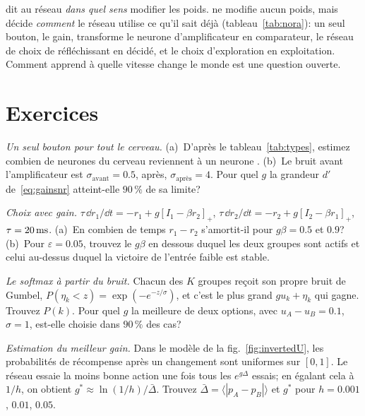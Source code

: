  dit au réseau \emph{dans quel sens} modifier les poids.  ne modifie aucun poids, mais décide \emph{comment} le réseau utilise ce qu'il sait déjà (tableau~\ref{tab:nora}): un seul bouton, le gain, transforme le neurone d'amplificateur en comparateur, le réseau de choix de \og réfléchissant\fg{} en \og décidé\fg{}, et le choix d'exploration en exploitation. Comment  apprend à quelle vitesse change le monde est une question ouverte.

\section{Exercices}

\begin{exercise}[\lvlA]
\label{ex:08:1}
\emph{Un seul bouton pour tout le cerveau.} (a)~D'après le tableau~\ref{tab:types}, estimez combien de neurones du cerveau reviennent à un neurone . (b)~Le bruit avant l'amplificateur est $\sigma_{\text{avant}}=0.5$, après, $\sigma_{\text{après}}=4$. Pour quel $g$ la grandeur $d'$ de~\eqref{eq:gainsnr} atteint-elle $90\,\%$ de sa limite?
\end{exercise}

\begin{exercise}[\lvlB]
\label{ex:08:2}
\emph{Choix avec gain.} $\tau\,\dd r_1/\dd t=-r_1+g[I_1-\beta r_2]_+$, $\tau\,\dd r_2/\dd t=-r_2+g[I_2-\beta r_1]_+$, $\tau=20\,\text{ms}$. (a)~En combien de temps $r_1-r_2$ s'amortit-il pour $g\beta=0.5$ et $0.9$? (b)~Pour $\varepsilon=0.05$, trouvez le $g\beta$ en dessous duquel les deux groupes sont actifs et celui au-dessus duquel la victoire de l'entrée faible est stable.
\end{exercise}

\begin{exercise}[\lvlA]
\label{ex:08:3}
\emph{Le softmax à partir du bruit.} Chacun des $K$ groupes reçoit son propre bruit de Gumbel, $P(\eta_k<z)=\exp(-e^{-z/\sigma})$, et c'est le plus grand $gu_k+\eta_k$ qui gagne. Trouvez $P(k)$. Pour quel $g$ la meilleure de deux options, avec $u_A-u_B=0.1$, $\sigma=1$, est-elle choisie dans $90\,\%$ des cas?
\end{exercise}

\begin{exercise}[\lvlB]
\label{ex:08:4}
\emph{Estimation du meilleur gain.} Dans le modèle de la fig.~\ref{fig:invertedU}, les probabilités de récompense après un changement sont uniformes sur $[0,1]$. Le réseau essaie la moins bonne action une fois tous les $e^{g\Delta}$ essais; en égalant cela à $1/h$, on obtient $g^*\approx\ln(1/h)/\bar\Delta$. Trouvez $\bar\Delta=\langle|p_A-p_B|\rangle$ et $g^*$ pour $h=0.001$, $0.01$, $0.05$.
\end{exercise}

